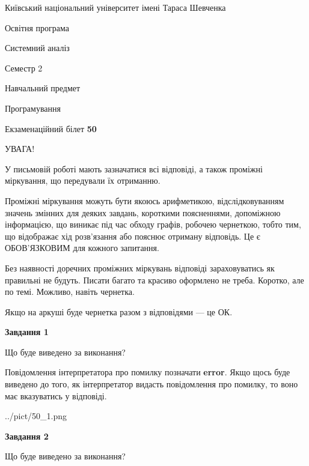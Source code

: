 \documentclass[12pt, ukrainian]{article}
\begin{document}
{{\begin {small}\par
{ \center  Київський національний університет імені Тараса Шевченка \par}
{\parbox {5 cm}{Освітня програма \hfill}{\parbox {7 cm}{Системний аналіз \hfill}}\parbox {6 cm}{\hfill Семестр 2}}\par
{\parbox {5 cm} {Навчальний предмет \hfill}\parbox {7 cm}{Програмування \hfill}\parbox {6cm}{\hfill}\par}\vspace{-7pt} \end{small}}{\center Екзаменаційний білет \No \textbf
{ 50 }\par}}
{
\begin {large}
УВАГА!

У письмовій роботі мають зазначатися всі відповіді, а також проміжні міркування, що передували їх отриманню.

Проміжні міркування можуть бути якоюсь арифметикою, відслідковуванням зна\-чень змінних для деяких завдань,
короткими поясненнями, допоміжною інформацією, що виникає під час обходу графів, робочею чернеткою,
тобто тим, що відображає хід розв’язання або пояснює отриману відповідь.
Це є ОБОВ’ЯЗКОВИМ для кожного запитання.

Без наявності доречних проміжних міркувань відповіді зараховуватись як правиль\-ні не будуть.
Писати багато та красиво оформлено не треба. Коротко, але по темі. Можли\-во, навіть чернетка.

Якщо на аркуші буде чернетка разом з відповідями --- це ОК.

\newpage

{\begin {center}\textbf{Завдання 1}\end {center}}\par
Що буде виведено за виконання?

Повідомлення інтерпретатора про помилку позначати \textbf{error}.
Якщо щось буде виведено до того, як інтерпретатор видасть повідомлення про помилку, 
то воно має вказуватись у відповіді. \par


\begin{center}
	{../pict/50_1.png}
\end{center}
\newpage

{\begin {center}\textbf{Завдання 2}\end {center}}\par
Що буде виведено за виконання?


\end{large}}
\end{document}

